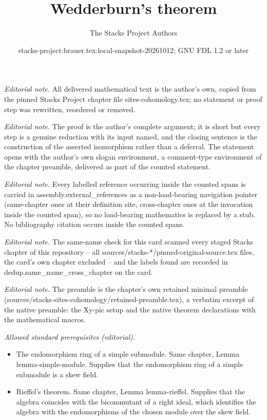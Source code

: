 \documentclass[10pt,a4paper]{amsart}
\title{Wedderburn's theorem}
\author{The Stacks Project Authors}
\date{stacks-project:brauer.tex:local-snapshot-20261012; GNU FDL 1.2 or later}
\theoremstyle{plain}
\theoremstyle{definition}
\theoremstyle{remark}
\numberwithin{equation}{subsection}
\begin{document}
\maketitle
\noindent\textit{Editorial note.} All delivered mathematical text is the author's own, copied from the pinned Stacks Project chapter file sites-cohomology.tex; no statement or proof step was rewritten, reordered or removed.\par\medskip
\noindent\textit{Editorial note.} The proof is the author's complete argument; it is short but every step is a genuine reduction with its input named, and the closing sentence is the construction of the asserted isomorphism rather than a deferral. The statement opens with the author's own slogan environment, a comment-type environment of the chapter preamble, delivered as part of the counted statement.\par\medskip
\noindent\textit{Editorial note.} Every labelled reference occurring inside the counted spans is carried in assembly.external\_references as a non-load-bearing navigation pointer (same-chapter ones at their definition site, cross-chapter ones at the invocation inside the counted span), so no load-bearing mathematics is replaced by a stub. No bibliography citation occurs inside the counted spans.\par\medskip
\noindent\textit{Editorial note.} The same-name check for this card scanned every staged Stacks chapter of this repository -- all sources/stacks-*/pinned-original-source.tex files, the card's own chapter excluded -- and the labels found are recorded in dedup.same\_name\_cross\_chapter on the card.\par\medskip
\noindent\textit{Editorial note.} The preamble is the chapter's own retained minimal preamble (sources/stacks-sites-cohomology/retained-preamble.tex), a verbatim excerpt of the native preamble: the Xy-pic setup and the native theorem declarations with the mathematical macros.\par\medskip
\noindent\textit{Allowed standard prerequisites (editorial).}\begin{itemize}
\item The endomorphism ring of a simple submodule. Same chapter, Lemma lemma-simple-module. Supplies that the endomorphism ring of a simple submodule is a skew field.
\item Rieffel's theorem. Same chapter, Lemma lemma-rieffel. Supplies that the algebra coincides with the bicommutant of a right ideal, which identifies the algebra with the endomorphisms of the chosen module over the skew field.
\end{itemize}\medskip
\end{document}
